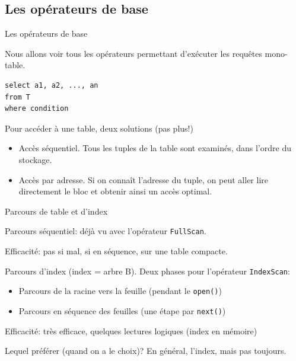 
\subsection{Les opérateurs de base}

\begin{frame}[fragile]{Les opérateurs de base}

Nous allons voir tous les opérateurs permettant d'exécuter les
requêtes mono-table.

\begin{verbatim}
select a1, a2, ..., an 
from T 
where condition
\end{verbatim}

\vfill

Pour accéder à une table, deux solutions (pas plus!)

\begin{itemize}
 \item \alert{Accès séquentiel}. Tous les tuples de la table 
      sont examinés, dans l'ordre du stockage.
 \item \alert{Accès par adresse}. Si on connaît l'adresse du
      tuple, on peut aller lire
      directement le bloc et obtenir ainsi un accès optimal.
\end{itemize}

\vfill


\end{frame}


\begin{frame}[fragile]{Parcours de table et d'index}

\alert{Parcours séquentiel}: déjà vu avec l'opérateur \texttt{FullScan}.
\smallskip

\alert{Efficacité}: pas si mal, si en séquence, sur une table compacte.

\vfill

\alert{Parcours d'index} (index = arbre B). Deux phases pour l'opérateur \texttt{IndexScan}:

\begin{itemize} 
  \item \alert{Parcours de la racine vers la feuille} (pendant le \texttt{open()})
  \item \alert{Parcours en séquence des feuilles} (une étape par \texttt{next()})
  
\end{itemize}

\smallskip

\alert{Efficacité}: très efficace, quelques lectures logiques (index en mémoire)

\vfill

Lequel préférer (quand on a le choix)? En général, l'index, mais pas toujours.

\end{frame}

